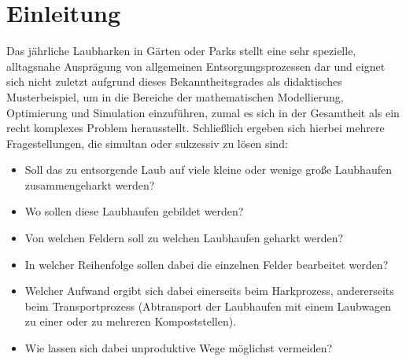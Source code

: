 \documentclass[fontsize=12pt,doubleside,openany,listof=totoc,listof=flat,listof=nochaptergap,numbers=noenddot]{scrbook}
\author{Hermann-Josef Kruse}
\newcommand{\changefont}[3]{
\fontfamily{#1} \fontseries{#2} \fontshape{#3} \selectfont}
\theoremstyle{style}
\begin{document}











\tableofcontents


\mainmatter

\chapter{Einleitung}
Das jährliche Laubharken in Gärten oder Parks stellt eine sehr spezielle, alltagsnahe Ausprägung von allgemeinen Entsorgungsprozessen dar und eignet sich nicht zuletzt aufgrund dieses \glqq Bekanntheitsgrades\grqq{}  als didaktisches Musterbeispiel, um in die Bereiche der mathematischen Modellierung, Optimierung und Simulation einzuführen, zumal es sich in der Gesamtheit als ein recht komplexes Problem herausstellt. Schließlich ergeben sich hierbei mehrere Fragestellungen, die simultan oder sukzessiv zu lösen sind: 

\begin{itemize} 
\item Soll das zu entsorgende Laub auf viele kleine oder wenige große Laubhaufen zusammengeharkt werden? 
\item Wo sollen diese Laubhaufen gebildet werden? 
\item Von welchen Feldern soll zu welchen Laubhaufen geharkt werden? 
\item In welcher Reihenfolge sollen dabei die einzelnen Felder bearbeitet werden?
\item Welcher Aufwand ergibt sich dabei einerseits beim Harkprozess, andererseits beim Transportprozess (Abtransport der Laubhaufen mit einem Laubwagen zu einer oder zu mehreren Kompoststellen). 
\item Wie lassen sich dabei unproduktive Wege möglichst vermeiden? 
\end{itemize}
\end{document}
